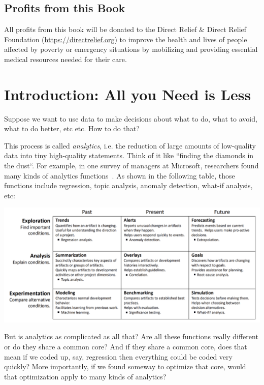 \documentclass[landscape,	DIV=calc,%
							paper=letter,%
							fontsize=10pt,%
							twocolumn]{scrartcl}	 					%
\begin{document}
\subsection*{Profits from this Book}
All profits from this book will be donated to the 
Direct Relief
\& Direct Relief Foundation 
(\url{https://directrelief.org}) to improve the health and lives of
people affected by poverty or emergency situations by mobilizing
and providing essential medical resources needed for their care.


\clearpage
\tableofcontents
\clearpage


\clearpage \section{Introduction: All you Need is Less}

Suppose we want to use data to make decisions about what to do,
what to avoid, what to do better, etc etc. How to do that?

This process is called {\em analytics}, i.e. the reduction of large
amounts of low-quality data into tiny high-quality statements. Think of it like
``finding the diamonds in the dust``. 
For example,
in one survey of managers at   Microsoft, 
researchers found many kinds  of analytics functions~\cite{buse2012information}.
As shown in the following table, those  functions include regression, topic analysis, anomaly detection, what-if analysis,
etc:


\includegraphics[width=\linewidth]{Buse.png} 

But is analytics as complicated as all that? Are all these functions really
different or do they share a
common core? And if they share a common core,
does that mean if we coded up, say, regression then everything could be coded
very quickly? 
More importantly, if we found someway to optimize
that core, would that optimization apply to many kinds of analytics?
\end{document}
